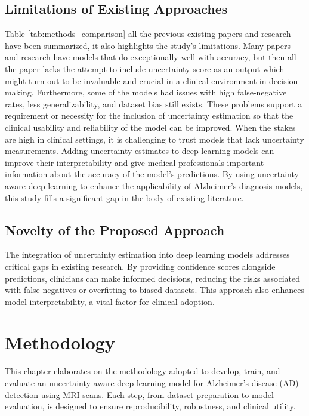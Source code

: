 \documentclass[12pt,twocolumn]{report}
\begin{document}
\section{Limitations of Existing Approaches}
Table \ref{tab:methods_comparison} all the previous existing papers and research have been summarized, it also highlights the study's limitations. Many papers and research have models that do exceptionally well with accuracy, but then all the paper lacks the attempt to include uncertainty score as an output which might turn out to be invaluable and crucial in a clinical environment in decision-making. Furthermore, some of the models had issues with high false-negative rates, less generalizability, and dataset bias still exists. These problems support a requirement or necessity for the inclusion of uncertainty estimation so that the clinical usability and reliability of the model can be improved. When the stakes are high in clinical settings, it is challenging to trust models that lack uncertainty measurements. Adding uncertainty estimates to deep learning models can improve their interpretability and give medical professionals important information about the accuracy of the model's predictions. By using uncertainty-aware deep learning to enhance the applicability of Alzheimer's diagnosis models, this study fills a significant gap in the body of existing literature.


\section{Novelty of the Proposed Approach}
The integration of uncertainty estimation into deep learning models addresses critical gaps in existing research. By providing confidence scores alongside predictions, clinicians can make informed decisions, reducing the risks associated with false negatives or overfitting to biased datasets. This approach also enhances model interpretability, a vital factor for clinical adoption.


\chapter{Methodology}

This chapter elaborates on the methodology adopted to develop, train, and evaluate an uncertainty-aware deep learning model for Alzheimer’s disease (AD) detection using MRI scans. Each step, from dataset preparation to model evaluation, is designed to ensure reproducibility, robustness, and clinical utility.
\end{document}
